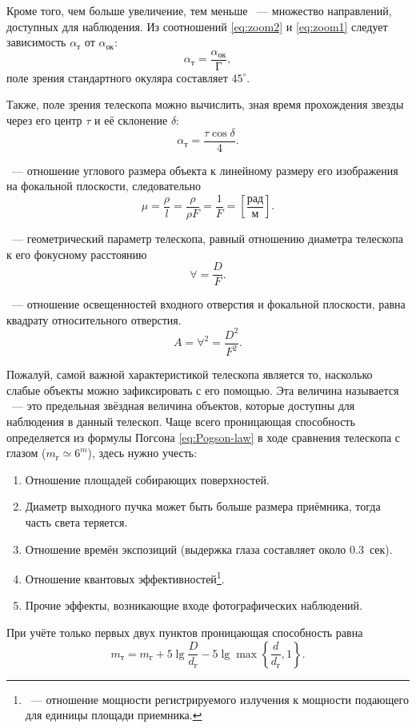 Кроме того, чем больше увеличение, тем меньше ~--- множество направлений, доступных для наблюдения. Из соотношений \eqref{eq:zoom2} и \eqref{eq:zoom1} следует зависимость  $\alpha_\text{т}$ от  $\alpha_\text{ок}$:
\begin{equation}
\alpha_\text{т} = \frac{\alpha_\text{ок}}{\text{Г}},
\end{equation}
поле зрения стандартного окуляра составляет $45^\circ$.

Также, поле зрения телескопа можно вычислить, зная время прохождения звезды через его центр $\tau$ и её склонение $\delta$:
\begin{equation}
\alpha_\text{т} = \frac{\tau \cos\delta}{4}.
\end{equation}

~--- отношение углового размера объекта к линейному размеру его изображения на фокальной плоскости, следовательно
\begin{equation}
\mu = \frac{\rho}{l} = \frac{\rho}{\rho F} = \frac{1}{F}=\left[\frac{\text{рад}}{\text{м}}\right].
\end{equation}

~--- геометрический параметр телескопа, равный отношению диаметра телескопа к его фокусному расстоянию
\begin{equation}
\forall=\frac{D}{F}.
\end{equation}

~--- отношение освещенностей входного отверстия и фокальной плоскости, равна квадрату относительного отверстия.
\begin{equation}
A=\forall^2=\frac{D^2}{F^2}.
\end{equation}

Пожалуй, самой важной характеристикой телескопа является то, насколько слабые объекты можно зафиксировать с его помощью. Эта величина называется ~--- это предельная звёздная величина объектов, которые доступны для наблюдения в данный телескоп. Чаще всего проницающая способность определяется из формулы Погсона \eqref{eq:Pogson-law} в ходе сравнения телескопа с глазом ($m_\text{г} \simeq 6^m$), здесь нужно учесть:
\begin{enumerate}
	\item Отношение площадей собирающих поверхностей.
	\item Диаметр выходного пучка может быть больше размера приёмника, тогда часть света теряется.
	\item Отношение времён экспозиций (выдержка глаза составляет около 0.3~сек).
	\item Отношение квантовых эффективностей\footnote{~--- отношение мощности регистрируемого излучения к мощности подающего для единицы площади приемника.}.
	\item Прочие эффекты, возникающие входе фотографических наблюдений.
\end{enumerate}
При учёте только первых двух пунктов проницающая способность равна
\begin{equation}
m_\text{т} = m_\text{г} + 5\lg\frac{D}{d_\text{г}} - 5\lg\max \left\{ \frac{d}{d_\text{г}}, 1\right\}.
\end{equation}
